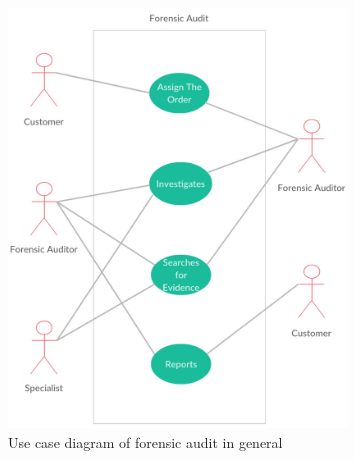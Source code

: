 \begin{figure}[h]
	\begin{center} 
	\includegraphics[width=0.8\textwidth]{img/usecase/use_case-FA_general2.pdf}
	\end{center}
	\caption{Use case diagram of forensic audit in general}
\end{figure}

